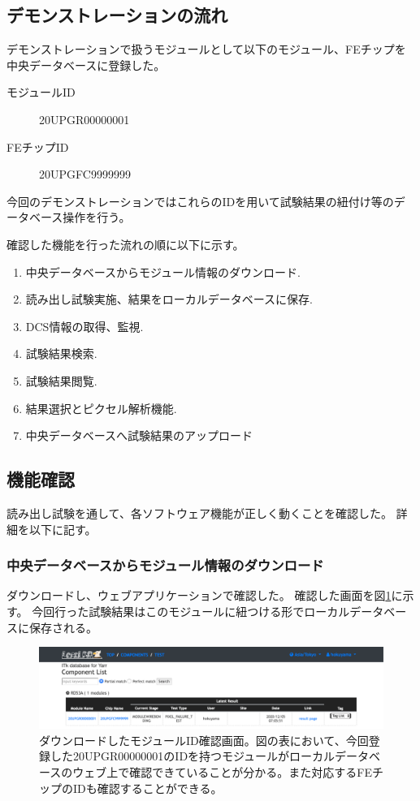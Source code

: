 \clearpage
\subsection{デモンストレーションの流れ}
デモンストレーションで扱うモジュールとして以下のモジュール、FEチップを中央データベースに登録した。
\begin{description}
  \item[モジュールID] 20UPGR00000001
  \item[FEチップID] 20UPGFC9999999
\end{description}
今回のデモンストレーションではこれらのIDを用いて試験結果の紐付け等のデータベース操作を行う。

確認した機能を行った流れの順に以下に示す。
\begin{enumerate}
  \item 中央データベースからモジュール情報のダウンロード.
  \item 読み出し試験実施、結果をローカルデータベースに保存.
  \item DCS情報の取得、監視.
  \item 試験結果検索.
  \item 試験結果閲覧.
  \item 結果選択とピクセル解析機能.
  \item 中央データベースへ試験結果のアップロード
\end{enumerate}

\subsection{機能確認}
読み出し試験を通して、各ソフトウェア機能が正しく動くことを確認した。
詳細を以下に記す。

\subsubsection{中央データベースからモジュール情報のダウンロード}
ダウンロードし、ウェブアプリケーションで確認した。
確認した画面を図\ref{demo_download_SCC}に示す。
今回行った試験結果はこのモジュールに紐つける形でローカルデータベースに保存される。

\begin{figure}[bpt]\centering
\includegraphics[width=14cm]{demo_download_SCC}
\caption[ダウンロードしたモジュールID確認画面]{ダウンロードしたモジュールID確認画面。図の表において、今回登録した20UPGR00000001のIDを持つモジュールがローカルデータベースのウェブ上で確認できていることが分かる。また対応するFEチップのIDも確認することができる。}
\label{demo_download_SCC}
\end{figure}

